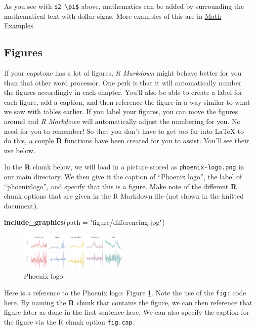 \documentclass[12pt,oneside]{chicagocapstone}
\newenvironment{Shaded}{\begin{snugshade}}{\end{snugshade}}
\newcommand{\KeywordTok}[1]{\textcolor[rgb]{0.13,0.29,0.53}{\textbf{#1}}}
\newcommand{\DataTypeTok}[1]{\textcolor[rgb]{0.13,0.29,0.53}{#1}}
\newcommand{\StringTok}[1]{\textcolor[rgb]{0.31,0.60,0.02}{#1}}
\newcommand{\NormalTok}[1]{#1}
\begin{document}
As you see with \texttt{\$2\ \textbackslash{}pi\$} above, mathematics
can be added by surrounding the mathematical text with dollar signs.
More examples of this are in \protect\hyperlink{math-examples}{Math
Examples}.

\subsection*{Figures}\label{figures}

If your capstone has a lot of figures, \emph{R Markdown} might behave
better for you than that other word processor. One perk is that it will
automatically number the figures accordingly in each chapter. You'll
also be able to create a label for each figure, add a caption, and then
reference the figure in a way similar to what we saw with tables
earlier. If you label your figures, you can move the figures around and
\emph{R Markdown} will automatically adjust the numbering for you. No
need for you to remember! So that you don't have to get too far into
LaTeX to do this, a couple \textbf{R} functions have been created for
you to assist. You'll see their use below.

In the \textbf{R} chunk below, we will load in a picture stored as
\texttt{phoenix-logo.png} in our main directory. We then give it the
caption of ``Phoenix logo'', the label of ``phoenixlogo'', and specify
that this is a figure. Make note of the different \textbf{R} chunk
options that are given in the R Markdown file (not shown in the knitted
document).
\begin{Shaded}
\begin{Highlighting}[]
\KeywordTok{include_graphics}\NormalTok{(}\DataTypeTok{path =} \StringTok{"figure/differencing.jpg"}\NormalTok{)}
\end{Highlighting}
\end{Shaded}
\begin{figure}

{\centering \includegraphics[width=200px]{figure/differencing} 

}

\caption{Phoenix logo}\label{fig:phoenixlogo}
\end{figure}
Here is a reference to the Phoenix logo: Figure \ref{fig:phoenixlogo}.
Note the use of the \texttt{fig:} code here. By naming the \textbf{R}
chunk that contains the figure, we can then reference that figure later
as done in the first sentence here. We can also specify the caption for
the figure via the R chunk option \texttt{fig.cap}.
\end{document}
